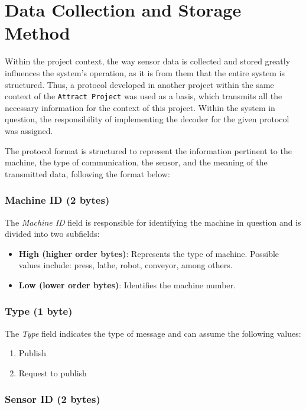 \section[Data Collection and Storage Method]{Data Collection and Storage Method}

Within the project context, the way sensor data is collected and stored greatly influences the system's operation, as it is from them that the entire system is structured. Thus, a protocol developed in another project within the same context of the \texttt{Attract Project} was used as a basis, which transmits all the necessary information for the context of this project. Within the system in question, the responsibility of implementing the decoder for the given protocol was assigned.

The protocol format is structured to represent the information pertinent to the machine, the type of communication, the sensor, and the meaning of the transmitted data, following the format below:

\subsubsection{Machine ID (2 bytes)}

The \textit{Machine ID} field is responsible for identifying the machine in question and is divided into two subfields:

\begin{itemize}
    \item \textbf{High (higher order bytes)}: Represents the type of machine. Possible values include: press, lathe, robot, conveyor, among others.
    \item \textbf{Low (lower order bytes)}: Identifies the machine number.
\end{itemize}

\subsubsection{Type (1 byte)}

The \textit{Type} field indicates the type of message and can assume the following values:
\begin{enumerate}
    \item Publish
    \item Request to publish
\end{enumerate}

\subsubsection{Sensor ID (2 bytes)}

